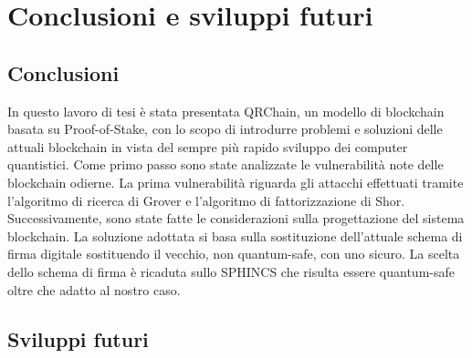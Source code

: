 \chapter{Conclusioni e sviluppi futuri}
\section{Conclusioni}
In questo lavoro di tesi è stata presentata QRChain, un modello di blockchain basata su Proof-of-Stake, con lo scopo di introdurre problemi e soluzioni delle attuali blockchain in vista del sempre più rapido sviluppo dei computer quantistici. Come primo passo sono state analizzate le vulnerabilità note delle blockchain odierne. La prima vulnerabilità riguarda gli attacchi effettuati tramite l'algoritmo di ricerca di Grover e l'algoritmo di fattorizzazione di Shor. Successivamente, sono state fatte le considerazioni sulla progettazione del sistema blockchain. La soluzione adottata si basa sulla sostituzione dell'attuale schema di firma digitale sostituendo il vecchio, non quantum-safe, con uno sicuro. La scelta dello schema di firma è ricaduta sullo SPHINCS che risulta essere quantum-safe oltre che adatto al nostro caso.

\section{Sviluppi futuri}



